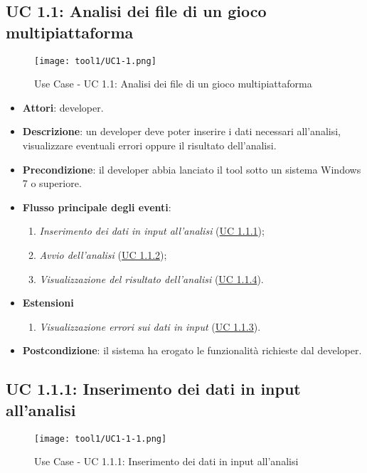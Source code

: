 	\subsection{UC 1.1: Analisi dei file di un gioco multipiattaforma}
		\label{subsec:UC1.1}
		
		\begin{figure}[h!] 
			\centering 
			\texttt{[image: tool1/UC1-1.png]} 
			\caption{Use Case - UC 1.1: Analisi dei file di un gioco multipiattaforma}
		\end{figure}
		
		\begin{itemize}
			\item\textbf{Attori}: developer.
			\item\textbf{Descrizione}: un developer deve poter inserire i dati necessari all'analisi, visualizzare eventuali errori oppure il risultato dell'analisi.
			\item\textbf{Precondizione}: il developer abbia lanciato il tool sotto un sistema Windows 7 o superiore.
			\item\textbf{Flusso principale degli eventi}: 
			\begin{enumerate}
				\item\textit{Inserimento dei dati in input all'analisi} (\hyperref[subsec:UC1.1.1]{UC 1.1.1});
				\item\textit{Avvio dell'analisi} (\hyperref[subsec:UC1.1.2]{UC 1.1.2});
				\item\textit{Visualizzazione del risultato dell'analisi} (\hyperref[subsec:UC1.1.4]{UC 1.1.4}).
			\end{enumerate}
			\item \textbf{Estensioni}
			\begin{enumerate}
				\item\textit{Visualizzazione errori sui dati in input} (\hyperref[subsec:UC1.1.3]{UC 1.1.3}).
			\end{enumerate}
			\item\textbf{Postcondizione}: il sistema ha erogato le funzionalità richieste dal developer.
		\end{itemize}
	
	\subsection{UC 1.1.1: Inserimento dei dati in input all'analisi}
		\label{subsec:UC1.1.1}
		
		\begin{figure}[t] 
			\centering 
			\texttt{[image: tool1/UC1-1-1.png]} 
			\caption{Use Case - UC 1.1.1: Inserimento dei dati in input all'analisi}
		\end{figure}
		
